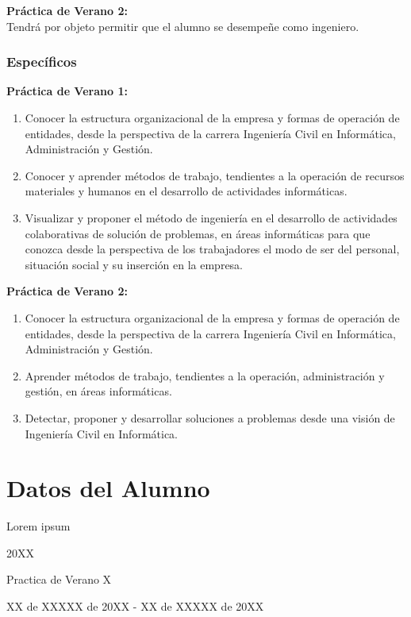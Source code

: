 \documentclass[letter,12pt]{report}
\begin{document}
\textbf{Práctica de Verano 2:\\} Tendrá por objeto permitir que el alumno se desempeñe como ingeniero.

\subsubsection{Específicos}
\textbf{Práctica de Verano 1:}
\begin{enumerate}\justifying
  \item Conocer la estructura organizacional de la empresa y formas de operación de entidades, desde la perspectiva de la carrera Ingeniería Civil en Informática, Administración y Gestión.
  \item Conocer y aprender métodos de trabajo, tendientes a la operación de recursos materiales y humanos en el desarrollo de actividades informáticas.
  \item Visualizar y proponer el método de ingeniería en el desarrollo de actividades colaborativas de solución de problemas, en áreas informáticas para que conozca desde la perspectiva de los trabajadores el modo de ser del personal, situación social y su inserción en la empresa.
\end{enumerate}

\textbf{Práctica de Verano 2:}
\begin{enumerate}\justifying
  \item Conocer la estructura organizacional de la empresa y formas de operación de entidades, desde la perspectiva de la carrera Ingeniería Civil en Informática, Administración y Gestión.
  \item Aprender métodos de trabajo, tendientes a la operación, administración y gestión, en áreas informáticas.
  \item Detectar, proponer y desarrollar soluciones a problemas desde una visión de Ingeniería Civil en Informática.
\end{enumerate}



\section{Datos del Alumno}
\begin{description}\justifying
  \item [Nombre del alumno] Lorem ipsum
  \item [Año de ingreso a la Universidad] 20XX
  \item [Tipo   de práctica] Practica de Verano X
  \item [Fecha de realización de la práctica] XX de XXXXX de 20XX - XX de XXXXX de 20XX
\end{description}
\end{document}
